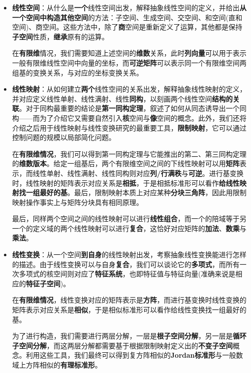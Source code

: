\documentclass[a4paper,UTF8,fontset=windows,AutoFakeBold]{ctexart}
\begin{document}
\begin{itemize}
    \item \textbf{线性空间}：从什么是\textbf{一个}线性空间出发，解释抽象线性空间的定义，并给出\textbf{从一个空间中构造其他空间}的方法：子空间、生成空间、交空间、和空间(直和空间)、商空间。这些方法中，除了\textbf{商}空间是重新定义了运算，其他都是保持\textbf{子空间}性质，\textbf{继承}原有的运算。
    
    在\textbf{有限维}情况，我们需要知道上述空间的\textbf{维数}关系，此时\textbf{列向量}可以用于表示一般有限维线性空间中向量的坐标，而\textbf{可逆矩阵}可以表示同一个有限维空间两组基的变换关系，与对应的坐标变换关系。

    \item \textbf{线性映射}：从如何建立\textbf{两个}线性空间的关系出发，解释抽象线性映射的定义，并对应定义线性单射、线性满射、线性\textbf{同构}，以刻画两个线性空间\textbf{结构的关联}。对于同构最重要的结论是\textbf{第一同构定理}，叙述了如何从同态诱导出一个同构——而为了介绍它又需要自然引入\textbf{核}空间与\textbf{像}空间的概念。此外，我们还将介绍之后用于线性映射与线性变换研究的最重要工具，\textbf{限制映射}，它可以通过控制问题的规模以局部简化问题。
    
    在\textbf{有限维情况}，我们可以得到第一同构定理与它能推出的第二、第三同构定理的\textbf{维数版本}。给定一组基后，两个有限维空间之间的下线性映射可以用\textbf{矩阵}表示，而线性单射、线性满射、线性同构则对应\textbf{列/行满秩}与\textbf{可逆}。进行基变换时，线性映射的矩阵表示对应关系是\textbf{相抵}，于是相抵标准形可以看作\textbf{给线性映射找一组最好的基}。最后，限制映射本质上对应某种\textbf{分块三角阵}，因此用限制映射操作事实上与矩阵分块具有相同原理。

    最后，同样两个空间之间的线性映射可以进行\textbf{线性组合}，而一个的陪域等于另一个的定义域的两个线性映射可以进行\textbf{复合}，这恰好对应矩阵的\textbf{加法}、\textbf{数乘}与\textbf{乘法}。

    \item \textbf{线性变换}：从一个空间\textbf{到自身}的线性映射出发，考察抽象线性变换能进行怎样的描述。由于线性变换可以与自身\textbf{复合}，我们可以谈论它的\textbf{多项式}，而所有一次多项式的核空间则对应了\textbf{特征系统}，也即特征值与特征向量(准确来说是相应的\textbf{特征子空间})。
    
    在\textbf{有限维情况}，线性变换对应的矩阵表示是\textbf{方阵}，而进行基变换时线性变换的矩阵表示对应关系是\textbf{相似}，于是相似标准形可以看作给线性变换找一组最好的基。

    为了进行构造，我们需要进行两层分解，一层是\textbf{根子空间分解}，另一层是\textbf{循环子空间分解}，而这两层分解都需要基于根据限制映射定义出的\textbf{不变子空间}概念。利用这些工具，我们最终可以得到复方阵相似的\textbf{Jordan标准形}与一般数域上方阵相似的\textbf{有理标准形}。
\end{itemize}
\end{document}
